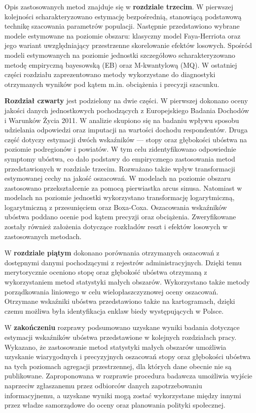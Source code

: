 Opis zastosowanych metod znajduje się w \textbf{rozdziale trzecim}. W pierwszej kolejności scharakteryzowano estymację bezpośrednią, stanowiącą podstawową technikę szacowania parametrów populacji. Następnie przedstawiono wybrane modele estymowane na poziomie obszaru: klasyczny model Faya-Herriota oraz jego wariant uwzględniający przestrzenne skorelowanie efektów losowych. Spośród modeli estymowanych na poziomie jednostki szczegółowo scharakteryzowano metodę empiryczną bayesowską (EB) oraz M-kwantylową (MQ). W ostatniej części rozdziału zaprezentowano metody wykorzystane do diagnostyki otrzymanych wyników pod kątem m.in. obciążenia i precyzji szacunku.

\textbf{Rozdział czwarty} jest podzielony na dwie części. W pierwszej dokonano oceny jakości danych jednostkowych pochodzących z Europejskiego Badania Dochodów i Warunków Życia 2011. W analizie skupiono się na badaniu wpływu sposobu udzielania odpowiedzi oraz imputacji na wartości dochodu respondentów. Druga część dotyczy estymacji dwóch wskaźników --- stopy oraz głębokości ubóstwa na poziomie podregionów i powiatów. W tym celu zidentyfikowano odpowiednie symptomy ubóstwa, co dało podstawy do empirycznego zastosowania metod przedstawionych w rozdziale trzecim. Rozważano także wpływ transformacji estymowanej cechy na jakość oszacowań. W modelach na poziomie obszaru zastosowano przekształcenie za pomocą pierwiastka arcus sinusa. Natomiast w modelach na poziomie jednostki wykorzystano transformację logarytmiczną, logarytmiczną z przesunięciem oraz Boxa-Coxa. Oszacowania wskaźników ubóstwa poddano ocenie pod kątem precyzji oraz obciążenia. Zweryfikowane zostały również założenia dotyczące rozkładów reszt i efektów losowych w zastosowanych metodach.

W \textbf{rozdziale piątym} dokonano porównania otrzymanych oszacowań z dostępnymi danymi pochodzącymi z rejestrów administracyjnych. Dzięki temu merytorycznie oceniono stopę oraz głębokość ubóstwa otrzymaną z wykorzystaniem metod statystyki małych obszarów. Wykorzystano także metody porządkowania liniowego w celu wielopłaszczyznowej oceny oszacowań. Otrzymane wskaźniki ubóstwa przedstawiono także na kartogramach, dzięki czemu możliwa była identyfikacja enklaw biedy występujących w Polsce. 

W \textbf{zakończeniu} rozprawy podsumowano uzyskane wyniki badania dotyczące estymacji wskaźników ubóstwa przedstawione w kolejnych rozdziałach pracy. Wykazano, że zastosowanie metod statystyki małych obszarów umożliwia uzyskanie wiarygodnych i precyzyjnych oszacowań stopy oraz głębokości ubóstwa na tych poziomach agregacji przestrzennej, dla których dane obecnie nie są publikowane. Zaproponowana w rozprawie procedura badawcza umożliwia wyjście naprzeciw zgłaszanemu przez odbiorców danych zapotrzebowaniu informacyjnemu, a uzyskane wyniki mogą zostać wykorzystane między innymi przez władze samorządowe do oceny oraz planowania polityki społecznej.